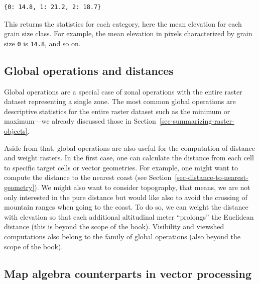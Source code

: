\documentclass[
  letterpaper,
]{krantz}
\begin{document}
\begin{verbatim}
{0: 14.8, 1: 21.2, 2: 18.7}
\end{verbatim}

This returns the statistics for each category, here the mean elevation
for each grain size class. For example, the mean elevation in pixels
characterized by grain size \texttt{0} is \texttt{14.8}, and so on.

\subsection{Global operations and
distances}\label{sec-global-operations-and-distances}

Global operations are a special case of zonal operations with the entire
raster dataset representing a single zone. The most common global
operations are descriptive statistics for the entire raster dataset such
as the minimum or maximum---we already discussed those in
Section~\ref{sec-summarizing-raster-objects}.

Aside from that, global operations are also useful for the computation
of distance and weight rasters. In the first case, one can calculate the
distance from each cell to specific target cells or vector geometries.
For example, one might want to compute the distance to the nearest coast
(see Section~\ref{sec-distance-to-nearest-geometry}). We might also want
to consider topography, that means, we are not only interested in the
pure distance but would like also to avoid the crossing of mountain
ranges when going to the coast. To do so, we can weight the distance
with elevation so that each additional altitudinal meter ``prolongs''
the Euclidean distance (this is beyond the scope of the book).
Visibility and viewshed computations also belong to the family of global
operations (also beyond the scope of the book).

\subsection{Map algebra counterparts in vector
processing}\label{map-algebra-counterparts-in-vector-processing}
\end{document}

